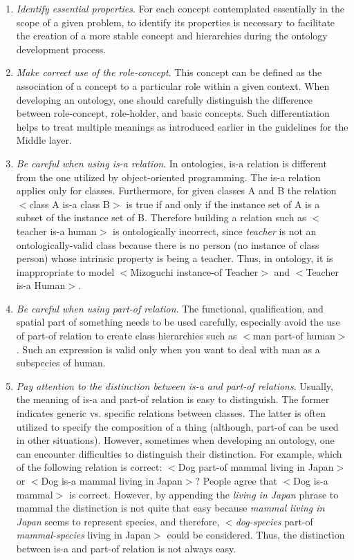 \begin{enumerate}
\item \emph{Identify essential properties}.
For each concept contemplated essentially in the scope of a given problem, to identify its properties is necessary to facilitate the creation of a more stable concept and hierarchies during the ontology development process.

\item \emph{Make correct use of the role-concept}.
This concept can be defined as the association of a concept to a particular role within a given context.
When developing an ontology, one should carefully distinguish the difference between role-concept, role-holder, and basic concepts.
Such differentiation helps to treat multiple meanings as introduced earlier in the guidelines for the Middle layer.

\item \emph{Be careful when using is-a relation}.
In ontologies, is-a relation is different from the one utilized by object-oriented programming.
The is-a relation applies only for classes.
Furthermore, for given classes A and B the relation $<$class A is-a class B$>$ is true if and only if the instance set of A is a subset of the instance set of B.
Therefore building a relation such as $<$teacher is-a human$>$ is ontologically incorrect, since \emph{teacher} is not an ontologically-valid class because there is no person (no instance of class person) whose intrinsic property is being a teacher.
Thus, in ontology, it is inappropriate to model $<$Mizoguchi instance-of Teacher$>$ and $<$Teacher is-a Human$>$.%

\item \emph{Be careful when using part-of relation}.
The functional, qualification, and spatial part of something needs to be used carefully, especially avoid the use of part-of relation to create class hierarchies such as $<$man part-of human$>$.
Such an expression is valid only when you want to deal with man as a subspecies of human.

\item \emph{Pay attention to the distinction between is-a and part-of relations}.
Usually, the meaning of is-a and part-of relation is easy to distinguish.
The former indicates generic vs. specific relations between classes.
The latter is often utilized to specify the composition of a thing (although, part-of can be used in other situations).
However, sometimes when developing an ontology, one can encounter difficulties to distinguish their distinction.
For example, which of the following relation is correct: $<$Dog part-of mammal living in Japan$>$ or $<$Dog is-a mammal living in Japan$>$? People agree that $<$Dog is-a mammal$>$ is correct.
However, by appending the \emph{living in Japan} phrase to mammal the distinction is not quite that easy because \emph{mammal living in Japan} seems to represent species, and therefore, $<$\emph{dog-species} part-of  \emph{mammal-species} living in Japan$>$ could be considered.
Thus, the distinction between is-a and part-of relation is not always easy.


\end{enumerate}
